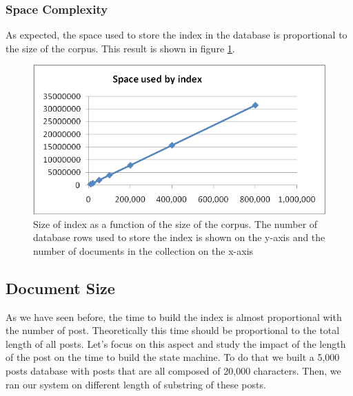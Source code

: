 \documentclass[10pt]{article}
\begin{document}
\subsubsection{Space Complexity}
As expected, the space used to store the index in the database is
proportional to the size of the corpus. This result is shown in figure
\ref{fig:corpsizespacecomplexbuildindex}.

\begin{figure}[h!]
  \begin{center}
    \includegraphics[width=\textwidth,height=!]{corpsizespacecomplexbuildindex}
  \end{center}
    \caption{Size of index as a function of the size of the
      corpus. The number of database rows used to store the index is
      shown on the y-axis and the number of documents in the
      collection on the x-axis} 
    \label{fig:corpsizespacecomplexbuildindex}
\end{figure}


\subsection{Document Size} 
As we have seen before, the time to build the index is almost
proportional with the number of post. Theoretically this time should
be proportional to the total length of all posts. Let’s focus on this
aspect and study the impact of the length of the post on the time to
build the state machine. To do that we built a 5,000 posts database
with posts that are all composed of 20,000 characters. Then, we ran
our system on different length of substring of these posts.  
\end{document}

